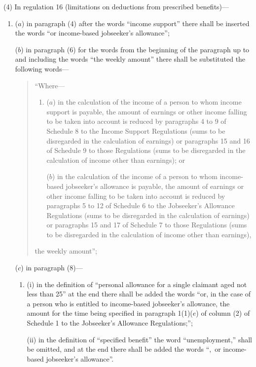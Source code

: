 \documentclass[a4paper]{article}
\begin{document}
(4) In regulation 16 (limitations on deductions from prescribed benefits)—
\begin{enumerate}\item[]
($a$) in paragraph (4) after the words “income support” there shall be inserted the words “or income-based jobseeker’s allowance”;

($b$) in paragraph (6) for the words from the beginning of the paragraph up to and including the words “the weekly amount” there shall be substituted the following words—
\begin{quotation}
“Where—
\begin{enumerate}\item[]
($a$) in the calculation of the income of a person to whom income support is payable, the amount of earnings or other income falling to be taken into account is reduced by paragraphs 4 to 9 of Schedule 8 to the Income Support Regulations (sums to be disregarded in the calculation of earnings) or paragraphs 15 and 16 of Schedule 9 to those Regulations (sums to be disregarded in the calculation of income other than earnings); or

($b$) in the calculation of the income of a person to whom income-based jobseeker’s allowance is payable, the amount of earnings or other income falling to be taken into account is reduced by paragraphs 5 to 12 of Schedule 6 to the Jobseeker’s Allowance Regulations (sums to be disregarded in the calculation of earnings) or paragraphs 15 and 17 of Schedule 7 to those Regulations (sums to be disregarded in the calculation of income other than earnings),
\end{enumerate}
the weekly amount”;
\end{quotation}

($c$) in paragraph (8)—
\begin{enumerate}\item[]
(i) in the definition of “personal allowance for a single claimant aged not less than 25” at the end there shall be added the words “or, in the case of a person who is entitled to income-based jobseeker’s allowance, the amount for the time being specified in paragraph 1(1)($e$) of column (2) of Schedule 1 to the Jobseeker’s Allowance Regulations;”;

(ii) in the definition of “specified benefit” the word “unemployment,” shall be omitted, and at the end there shall be added the words “,~or income-based jobseeker’s allowance”.
\end{enumerate}
\end{enumerate}
\end{document}
